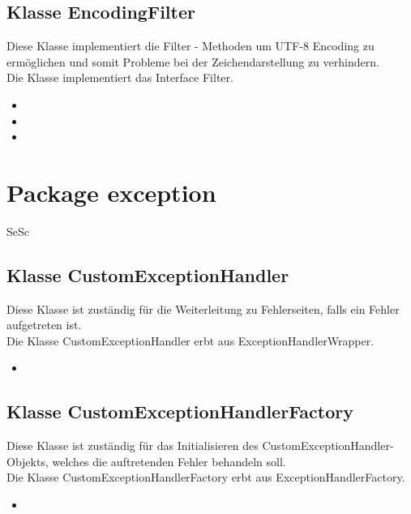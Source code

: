 	\subsection{Klasse EncodingFilter}
	Diese Klasse implementiert die Filter - Methoden um UTF-8 Encoding zu
	ermöglichen und somit Probleme bei der Zeichendarstellung zu verhindern.\\
	Die Klasse implementiert das Interface Filter.
	\begin{itemize}
		\item \override
		\item \override
		\item \override
	\end{itemize}
	
	\section{Package exception}
	\begin{tiny}
		SeSc
	\end{tiny}
	\subsection{Klasse CustomExceptionHandler}
	Diese Klasse ist zuständig für die Weiterleitung zu Fehlerseiten, falls ein Fehler aufgetreten
	ist. \\
	Die Klasse CustomExceptionHandler erbt aus ExceptionHandlerWrapper.
	\begin{itemize}
		\item \override
	\end{itemize}
	
	\subsection{Klasse CustomExceptionHandlerFactory}
	Diese Klasse ist zuständig für das  Initialisieren des CustomExceptionHandler-Objekts, welches die auftretenden Fehler behandeln soll.\\
	Die Klasse CustomExceptionHandlerFactory erbt aus ExceptionHandlerFactory.
	\begin{itemize}
		\item \override
	\end{itemize}
	
